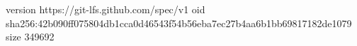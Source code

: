 version https://git-lfs.github.com/spec/v1
oid sha256:42b090ff075804db1cca0d46543f54b56eba7ec27b4aa6b1bb69817182de1079
size 349692
